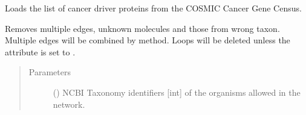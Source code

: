 \documentclass[letterpaper,10pt,english]{sphinxmanual}
\begin{document}
\begin{fulllineitems}
\begin{fulllineitems}
\begin{quote}
\begin{description}
\end{description}\end{quote}

\end{fulllineitems}


\begin{fulllineitems}
\label{\detokenize{reference:pypath.main.PyPath.cancer_gene_census_list}}
Loads the list of cancer driver proteins from the COSMIC Cancer
Gene Census.

\end{fulllineitems}


\begin{fulllineitems}
\label{\detokenize{reference:pypath.main.PyPath.clean_graph}}
Removes multiple edges, unknown molecules and those from wrong
taxon. Multiple edges will be combined by
{\hyperref[\detokenize{reference:pypath.main.PyPath.combine_attr}]{}} method.
Loops will be deleted unless the attribute
 is set to .
\begin{quote}\begin{description}
\item[{Parameters}] \leavevmode
{} () \textendash{} NCBI Taxonomy identifiers {[}int{]} of the organisms allowed
in the network.

\end{description}\end{quote}

\end{fulllineitems}



\end{fulllineitems}
\end{document}
